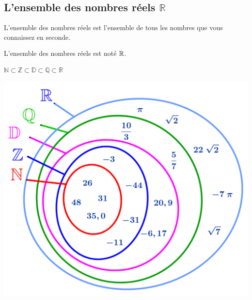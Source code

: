 
\begin{pageCours} %



\section{L'ensemble des nombres réels $\mathbb{R}$}

\begin{Def}
L'ensemble des nombres réels est l'ensemble de tous les nombres que vous connaissez en seconde.

L'ensemble des nombres réels est noté $\mathbb R$.
\end{Def}

\begin{Rq}
$\mathbb{N}\subset\mathbb{Z}\subset\mathbb{D}\subset\mathbb{Q}\subset\mathbb{R}$
\end{Rq}

\begin{center}
\includegraphics[width=.4\linewidth]{FIG/ensemble_de_nmbres.png} 
\end{center}

\end{pageCours} %


\begin{pageAD}  %
\restoregeometry %



\end{pageAD} %

